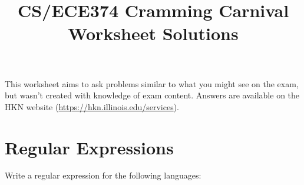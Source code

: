 \documentclass[fleqn]{article}
\title{CS/ECE374 Cramming Carnival Worksheet Solutions}
\author{}
\date{}
\begin{document}
\maketitle

\begin{center}
    This worksheet aims to ask problems similar to what you might see on the exam, but wasn't created with knowledge of exam content. Answers are available on the HKN website (\hyperlink{https://hkn.illinois.edu/services}{https://hkn.illinois.edu/services}).
\end{center}

\section{Regular Expressions}
Write a regular expression for the following languages:
\end{document}
